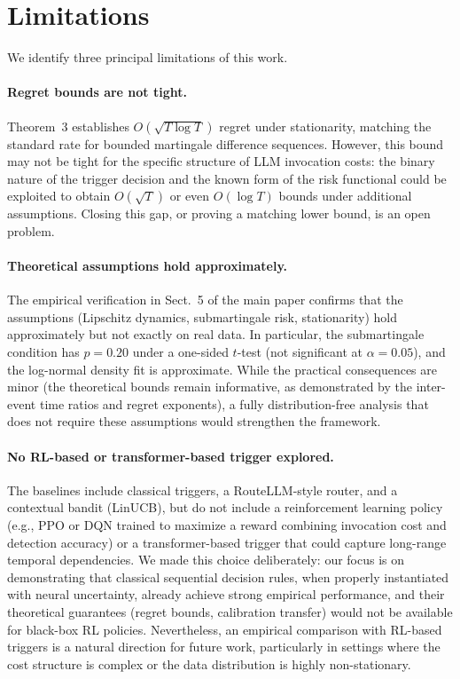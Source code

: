 \section{Limitations}
\label{app:limitations}

We identify three principal limitations of this work.

\paragraph{Regret bounds are not tight.}
Theorem~3 establishes $O(\sqrt{T\log T})$ regret under stationarity, matching the standard rate for bounded martingale difference sequences.
However, this bound may not be tight for the specific structure of LLM invocation costs: the binary nature of the trigger decision and the known form of the risk functional could be exploited to obtain $O(\sqrt{T})$ or even $O(\log T)$ bounds under additional assumptions.
Closing this gap, or proving a matching lower bound, is an open problem.

\paragraph{Theoretical assumptions hold approximately.}
The empirical verification in Sect.~5 of the main paper confirms that the assumptions (Lipschitz dynamics, submartingale risk, stationarity) hold approximately but not exactly on real data.
In particular, the submartingale condition has $p=0.20$ under a one-sided $t$-test (not significant at $\alpha=0.05$), and the log-normal density fit is approximate.
While the practical consequences are minor (the theoretical bounds remain informative, as demonstrated by the inter-event time ratios and regret exponents), a fully distribution-free analysis that does not require these assumptions would strengthen the framework.

\paragraph{No RL-based or transformer-based trigger explored.}
The baselines include classical triggers, a RouteLLM-style router, and a contextual bandit (LinUCB), but do not include a reinforcement learning policy (e.g., PPO or DQN trained to maximize a reward combining invocation cost and detection accuracy) or a transformer-based trigger that could capture long-range temporal dependencies.
We made this choice deliberately: our focus is on demonstrating that classical sequential decision rules, when properly instantiated with neural uncertainty, already achieve strong empirical performance, and their theoretical guarantees (regret bounds, calibration transfer) would not be available for black-box RL policies.
Nevertheless, an empirical comparison with RL-based triggers is a natural direction for future work, particularly in settings where the cost structure is complex or the data distribution is highly non-stationary.


